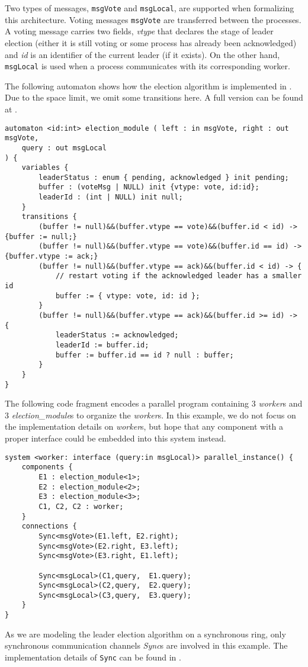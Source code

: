 Two types of messages, \texttt{msgVote} and \texttt{msgLocal}, are supported when formalizing this architecture. Voting messages \texttt{msgVote} are transferred between the processes. A voting message carries two fields, \emph{vtype} that declares the stage of leader election (either it is still voting or some process has already been acknowledged) and \emph{id} is an identifier of the current leader (if it exists). On the other hand, \texttt{msgLocal} is used when a process communicates with its corresponding worker.
\begin{example} The following automaton shows how the election algorithm is implemented in \lang{}. Due to the space limit, we omit some transitions here. A full version can be found at \cite{medmodels}.
\begin{lstlisting}[basicstyle=\scriptsize\ttfamily]
automaton <id:int> election_module ( left : in msgVote, right : out msgVote,
	query : out msgLocal
) {
	variables {
		leaderStatus : enum { pending, acknowledged } init pending;
		buffer : (voteMsg | NULL) init {vtype: vote, id:id};
		leaderId : (int | NULL) init null;
	}
	transitions {
		(buffer != null)&&(buffer.vtype == vote)&&(buffer.id < id) -> {buffer := null;}
		(buffer != null)&&(buffer.vtype == vote)&&(buffer.id == id) -> {buffer.vtype := ack;}
		(buffer != null)&&(buffer.vtype == ack)&&(buffer.id < id) -> {
			// restart voting if the acknowledged leader has a smaller id
			buffer := { vtype: vote, id: id };
		}
		(buffer != null)&&(buffer.vtype == ack)&&(buffer.id >= id) -> {
			leaderStatus := acknowledged;
			leaderId := buffer.id;
			buffer := buffer.id == id ? null : buffer;
		}
	}
}
\end{lstlisting}
\end{example}


The following code fragment encodes a parallel program containing 3 \emph{worker}s and 3 \emph{election\_module}s to organize the \emph{worker}s.  In this example, we do not focus on the implementation details on \emph{worker}s, but hope that any component with a proper interface could be embedded into this system instead. 

\begin{lstlisting}[basicstyle=\scriptsize\ttfamily]
system <worker: interface (query:in msgLocal)> parallel_instance() {
	components {
		E1 : election_module<1>;
		E2 : election_module<2>;
		E3 : election_module<3>;
		C1, C2, C2 : worker;
	}	
	connections {
		Sync<msgVote>(E1.left, E2.right);
		Sync<msgVote>(E2.right, E3.left);
		Sync<msgVote>(E3.right,	E1.left);
		
		Sync<msgLocal>(C1,query,  E1.query);
		Sync<msgLocal>(C2,query,  E2.query);
		Sync<msgLocal>(C3,query,  E3.query);
	}
}
\end{lstlisting}

As we are modeling the leader election algorithm on a synchronous ring, only synchronous communication channels \emph{Sync}s are involved in this example. The implementation details of \texttt{Sync} can be found in  \cite{medmodels}.